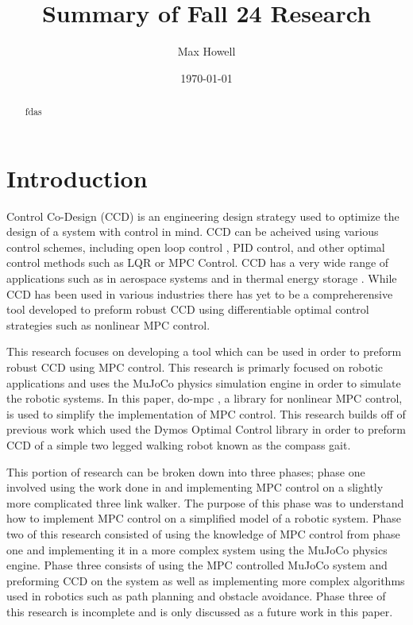 \documentclass{./springer/svjour3}
\title{Summary of Fall 24 Research}
\author{Max Howell}
\institute{University Of Tennessee Knoxville$^*$ ($^*$corresponding author),
          \email{mhowel30@vols.utk.edu} \\
        \\
          \at MABE, University of Tennessee, Knoxville,
          \at Nathan W. Dougherty Engineering Building, 1512 Middle Dr, Knoxville, TN 37916\\
}
\date{\today}
\begin{document}
\maketitle{}

\begin{abstract}

fdas

\end{abstract}

\section{Introduction}

Control Co-Design (CCD) is an engineering design strategy used to optimize the design of a system with control in mind. CCD can be acheived using various control schemes, 
including open loop control \cite{Sundarrajan2023}, PID control, and other optimal control methods such as LQR or MPC Control. CCD has a very wide range of applications such as in 
aerospace systems \cite{Van2019} and in thermal energy storage \cite{10177617}. While CCD has been used in various industries there has yet to be a compreherensive tool developed
to preform robust CCD using differentiable optimal control strategies such as nonlinear MPC control.

This research focuses on developing a tool which can be used in order to preform robust CCD using MPC control. This research is primarly focused on robotic applications and uses 
the MuJoCo \cite{todorov2012mujoco} physics simulation engine in order to simulate the robotic systems. In this paper, do-mpc \cite{FIEDLER2023105676}, a library for nonlinear MPC control, is used to simplify the 
implementation of MPC control. This research builds off of previous work \cite{Howell2024} which used the Dymos Optimal Control library \cite{Falck2021} in order to preform CCD of a simple 
two legged walking robot known as the compass gait. 

This portion of research can be broken down into three phases; phase one involved using the work done in \cite{Howell2024} and implementing MPC control on a slightly 
more complicated three link walker. The purpose of this phase was to understand how to implement MPC control on a simplified model of a robotic system.
Phase two of this research consisted of using the knowledge of MPC control from phase one and implementing it in a more complex system using the MuJoCo physics engine.
Phase three consists of using the MPC controlled MuJoCo system and preforming CCD on the system as well as implementing more complex algorithms used in robotics such as 
path planning and obstacle avoidance. Phase three of this research is incomplete and is only discussed as a future work in this paper.
\end{document}
